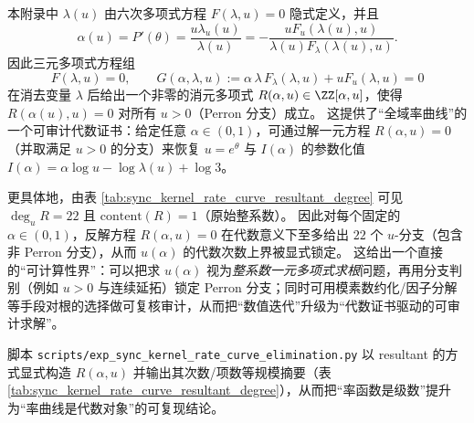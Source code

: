 \begin{remark}\label{rem:rate-algebraic-elimination}
本附录中 \(\lambda(u)\) 由六次多项式方程 \(F(\lambda,u)=0\) 隐式定义，并且
\[
\alpha(u)=P'(\theta)=\frac{u\lambda_u(u)}{\lambda(u)}
=-\frac{uF_u(\lambda(u),u)}{\lambda(u)F_\lambda(\lambda(u),u)}.
\]
因此三元多项式方程组
\[
F(\lambda,u)=0,\qquad
G(\alpha,\lambda,u):=\alpha\,\lambda\,F_\lambda(\lambda,u)+uF_u(\lambda,u)=0
\]
在消去变量 \(\lambda\) 后给出一个非零的消元多项式
\(
R(\alpha,u)\in\ZZ[\alpha,u]
\)，使得 \(R(\alpha(u),u)=0\) 对所有 \(u>0\)（Perron 分支）成立。
这提供了“全域率曲线”的一个可审计代数证书：给定任意 \(\alpha\in(0,1)\)，可通过解一元方程 \(R(\alpha,u)=0\)（并取满足 \(u>0\) 的分支）来恢复 \(u=e^\theta\) 与 \(I(\alpha)\) 的参数化值 \(I(\alpha)=\alpha\log u-\log\lambda(u)+\log 3\)。
\par
\noindent 更具体地，由表 \ref{tab:sync_kernel_rate_curve_resultant_degree} 可见 \(\deg_u R=22\) 且 \(\mathrm{content}(R)=1\)（原始整系数）。
因此对每个固定的 \(\alpha\in(0,1)\)，反解方程 \(R(\alpha,u)=0\) 在代数意义下至多给出 \(22\) 个 \(u\)-分支（包含非 Perron 分支），从而 \(u(\alpha)\) 的代数次数上界被显式锁定。
这给出一个直接的“可计算性界”：可以把求 \(u(\alpha)\) 视为\emph{整系数一元多项式求根}问题，再用分支判别（例如 \(u>0\) 与连续延拓）锁定 Perron 分支；同时可用模素数约化/因子分解等手段对根的选择做可复核审计，从而把“数值迭代”升级为“代数证书驱动的可审计求解”。
\par
脚本 \texttt{scripts/exp\_sync\_kernel\_rate\_curve\_elimination.py} 以 resultant 的方式显式构造 \(R(\alpha,u)\) 并输出其次数/项数等规模摘要（表 \ref{tab:sync_kernel_rate_curve_resultant_degree}），从而把“率函数是级数”提升为“率曲线是代数对象”的可复现结论。
\end{remark}

